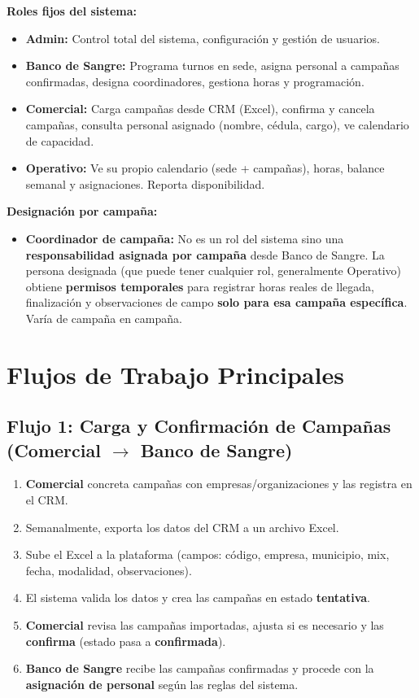 \documentclass[10pt,a4paper]{article}
\begin{document}
\textbf{Roles fijos del sistema:}
\begin{itemize}[leftmargin=2em]
    \item \textbf{Admin:} Control total del sistema, configuraci\'{o}n y gesti\'{o}n de usuarios.
    \item \textbf{Banco de Sangre:} Programa turnos en sede, asigna personal a campañas confirmadas, designa coordinadores, gestiona horas y programaci\'{o}n.
    \item \textbf{Comercial:} Carga campañas desde CRM (Excel), confirma y cancela campañas, consulta personal asignado (nombre, c\'{e}dula, cargo), ve calendario de capacidad.
    \item \textbf{Operativo:} Ve su propio calendario (sede + campañas), horas, balance semanal y asignaciones. Reporta disponibilidad.
\end{itemize}

\textbf{Designaci\'{o}n por campaña:}
\begin{itemize}[leftmargin=2em]
    \item \textbf{Coordinador de campaña:} No es un rol del sistema sino una \textbf{responsabilidad asignada por campaña} desde Banco de Sangre. La persona designada (que puede tener cualquier rol, generalmente Operativo) obtiene \textbf{permisos temporales} para registrar horas reales de llegada, finalizaci\'{o}n y observaciones de campo \textbf{solo para esa campaña espec\'{i}fica}. Var\'{i}a de campaña en campaña.
\end{itemize}

\section{Flujos de Trabajo Principales}

\subsection{Flujo 1: Carga y Confirmaci\'{o}n de Campañas (Comercial $\rightarrow$ Banco de Sangre)}

\begin{enumerate}[leftmargin=2em]
    \item \textbf{Comercial} concreta campañas con empresas/organizaciones y las registra en el CRM.
    \item Semanalmente, exporta los datos del CRM a un archivo Excel.
    \item Sube el Excel a la plataforma (campos: c\'{o}digo, empresa, municipio, mix, fecha, modalidad, observaciones).
    \item El sistema valida los datos y crea las campañas en estado \textbf{tentativa}.
    \item \textbf{Comercial} revisa las campañas importadas, ajusta si es necesario y las \textbf{confirma} (estado pasa a \textbf{confirmada}).
    \item \textbf{Banco de Sangre} recibe las campañas confirmadas y procede con la \textbf{asignaci\'{o}n de personal} seg\'{u}n las reglas del sistema.
\end{enumerate}
\end{document}
